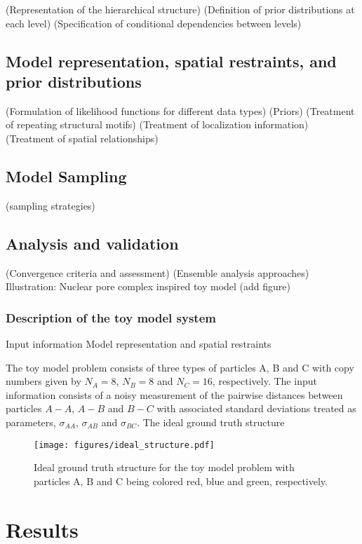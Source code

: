 \documentclass[journal=jcim,manuscript=article]{achemso}
\newcommand{\ignacia}[1]{%
    \textcolor{ignacia} {#1}%
}
\begin{document}
(Representation of the hierarchical structure)
(Definition of prior distributions at each level)
(Specification of conditional dependencies between levels)

\subsection{Model representation, spatial restraints, and prior distributions
}
(Formulation of likelihood functions for different data types)
(Priors)
(Treatment of repeating structural motifs)
(Treatment of localization information)
(Treatment of spatial relationships)


\subsection{Model Sampling}
(sampling strategies)

\subsection{Analysis and validation}
(Convergence criteria and assessment)
(Ensemble analysis approaches)
\ignacia{Illustration: Nuclear pore complex inspired toy model (add figure)}
\subsubsection{Description of the toy model system}

Input information
Model representation and spatial restraints

The toy model problem consists of three types of particles 
A, B and C with copy numbers given by $N_A=8$, $N_B=8$ and $N_C=16$,
respectively. The input information consists of a noisy measurement 
of the pairwise distances between particles $A-A$, $A-B$ and $B-C$
with associated standard deviations treated as parameters, 
$\sigma_{AA}$, $\sigma_{AB}$ and $\sigma_{BC}$.
The ideal ground truth structure 
\begin{figure}
    \centering
    \texttt{[image: figures/ideal\_structure.pdf]}
    \caption{Ideal ground truth structure for the toy model problem with 
    particles A, B and C being colored red, blue and green, respectively.}
    \label{fig:enter-label}
\end{figure}
\section{Results}
\end{document}

